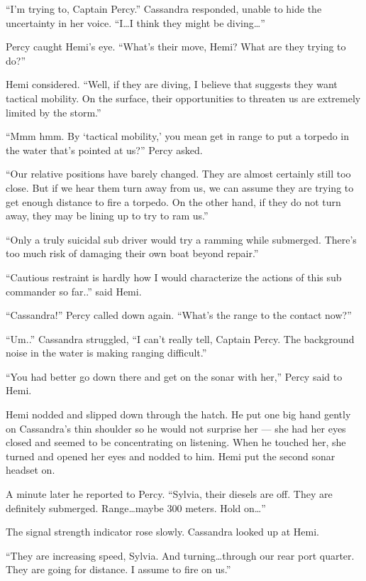 \documentclass[
]{scrbook}
\begin{document}
``I'm trying to, Captain Percy.'' Cassandra responded, unable to hide
the uncertainty in her voice. ``I\ldots I think they might be
diving\ldots{}''

Percy caught Hemi's eye. ``What's their move, Hemi? What are they trying
to do?''

Hemi considered. ``Well, if they are diving, I believe that suggests
they want tactical mobility. On the surface, their opportunities to
threaten us are extremely limited by the storm.''

``Mmm hmm. By `tactical mobility,' you mean get in range to put a
torpedo in the water that's pointed at us?'' Percy asked.

``Our relative positions have barely changed. They are almost certainly
still too close. But if we hear them turn away from us, we can assume
they are trying to get enough distance to fire a torpedo. On the other
hand, if they do not turn away, they may be lining up to try to ram
us.''

``Only a truly suicidal sub driver would try a ramming while submerged.
There's too much risk of damaging their own boat beyond repair.''

``Cautious restraint is hardly how I would characterize the actions of
this sub commander so far..'' said Hemi.

``Cassandra!'' Percy called down again. ``What's the range to the
contact now?''

``Um..'' Cassandra struggled, ``I can't really tell, Captain Percy. The
background noise in the water is making ranging difficult.''

``You had better go down there and get on the sonar with her,'' Percy
said to Hemi.

Hemi nodded and slipped down through the hatch. He put one big hand
gently on Cassandra's thin shoulder so he would not surprise her --- she
had her eyes closed and seemed to be concentrating on listening. When he
touched her, she turned and opened her eyes and nodded to him. Hemi put
the second sonar headset on.

A minute later he reported to Percy. ``Sylvia, their diesels are off.
They are definitely submerged. Range\ldots maybe 300 meters. Hold
on\ldots{}''

The signal strength indicator rose slowly. Cassandra looked up at Hemi.

``They are increasing speed, Sylvia. And turning\ldots through our rear
port quarter. They are going for distance. I assume to fire on us.''
\end{document}

